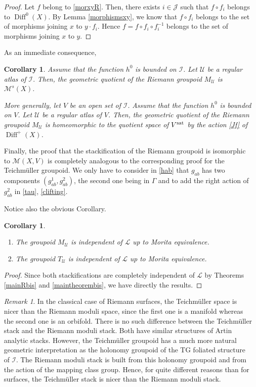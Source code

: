 \documentclass[10pt]{amsart}
\let\mathcal\mathscr
\DeclareMathOperator{\Diff}{Diff}
\theoremstyle{plain}
\newtheorem{corollary}[theorem]{Corollary}
\theoremstyle{definition}
\theoremstyle{remark}
\newtheorem{remark}[theorem]{Remark}
\numberwithin{equation}{section}
\newcommand{\cI}{\mathcal{I}}
\providecommand{\skpt}{\par\smallskip\noindent}
\begin{document}
\begin{proof}
Let $f$ belong to \eqref{morxyR}. Then, there exists $i\in\mathcal J$ such that $f\circ f_i$ belongs to $\Diff^0(X)$. By Lemma \ref{morphismsxy}, we know that
$f\circ f_i$ belongs to the set of morphisms joining $x$ to $y\cdot f_i$. Hence $f=f\circ f_i\circ f_i^{-1}$ belongs to the set of morphisms joining
$x$ to $y$.
\end{proof}
As an immediate consequence,
\begin{corollary}
\label{geoquotientR}
Assume that the function $h^0$ is bounded on $\cI$. Let $\mathcal U$ be a regular atlas of $\cI$. Then, the geometric quotient of the Riemann groupoid $M_{\mathcal U}$ is $\mathcal M^s(X)$.

More generally, let $V$ be an open set of $\cI$. Assume that the function $h^0$ is bounded on $V$. Let $\mathcal U$ be a regular atlas of $V$. Then, the geometric quotient of the Riemann groupoid $M_{\mathcal U}$ is homeomorphic to the quotient space of $V^{\textup{sat}}$ by the action \eqref{Jf} of $\Diff^+(X)$.
\end{corollary}

Finally, the proof that the stackification of the Riemann groupoid is isomorphic to $\mathcal M(X,V)$ is completely analogous to the corresponding proof for the Teichmüller groupoid. We only have to consider in \eqref{hab} that $g_{ab}$ has two components $(g^1_{ab},g^2_{ab})$, the second one being in $\Gamma$ and to add the right action of $g^2_{ab}$ in \eqref{tau}, \eqref{clifting}.

Notice also the obvious Corollary.

\skpt
\begin{corollary}
\label{Lindep}
\begin{enumerate}
\item
The groupoid $M_{\mathcal U}$ is independent of $\mathcal L$ up to Morita equivalence.
\item
The groupoid $T_{\mathcal U}$ is independent of $\mathcal L$ up to Morita equivalence.
\end{enumerate}
\end{corollary}

\begin{proof}
Since both stackifications are completely independent of $\mathcal L$ by Theorems \ref{mainRbis} and \ref{maintheorembis}, we have directly the results.
\end{proof}

\begin{remark}
\label{RvsT}
In the classical case of Riemann surfaces, the Teichmüller space is nicer than the Riemann moduli space, since the first one is a manifold whereas the second one is an orbifold. There is no such difference between the Teichmüller stack and the Riemann moduli stack. Both have similar structures of Artin analytic stacks. However, the Teichmüller groupoid has a much more natural geometric interpretation as the holonomy groupoid of the TG foliated structure of $\cI$. The Riemann moduli stack is built from this holonomy groupoid and from the action of the mapping class group. Hence, for quite different reasons than for surfaces, the Teichmüller stack is nicer than the Riemann moduli stack.
\end{remark}
\end{document}
